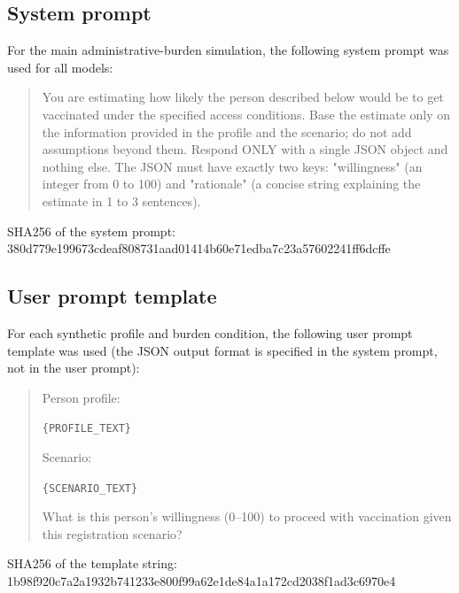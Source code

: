 \subsection*{System prompt}

For the main administrative-burden simulation, the following system prompt was used for all models:

\begin{quote}
You are estimating how likely the person described below would be to get vaccinated under the specified access conditions. Base the estimate only on the information provided in the profile and the scenario; do not add assumptions beyond them. Respond ONLY with a single JSON object and nothing else. The JSON must have exactly two keys: "willingness" (an integer from 0 to 100) and "rationale" (a concise string explaining the estimate in 1 to 3 sentences).

\end{quote}
\begin{flushleft}
{\footnotesize SHA256 of the system prompt:}\\
{\footnotesize\ttfamily 380d779e199673cdeaf808731aad01414b60e71edba7c23a57602241ff6dcffe}
\end{flushleft}
\begin{quote}
\end{quote}

\subsection*{User prompt template}

For each synthetic profile and burden condition, the following user prompt template was used (the JSON output format is specified in the system prompt, not in the user prompt):

\begin{quote}
Person profile:

\texttt{\{PROFILE\_TEXT\}}

Scenario:

\texttt{\{SCENARIO\_TEXT\}}

What is this person's willingness (0--100) to proceed with vaccination given this registration scenario?

\end{quote}
\begin{flushleft}
{\footnotesize SHA256 of the template string:}\\
{\footnotesize\ttfamily 1b98f920c7a2a1932b741233e800f99a62e1de84a1a172cd2038f1ad3c6970e4}
\end{flushleft}

